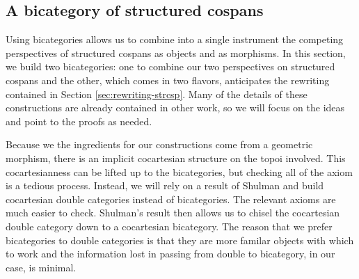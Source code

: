 \documentclass{amsart}
\theoremstyle{remark}
\theoremstyle{definition}
\begin{document}

\subsection{A bicategory of structured cospans}
\label{sec:bicat-strcsp}

Using bicategories allows us to combine into a single instrument the
competing perspectives of structured cospans as objects and as
morphisms. In this section, we build two bicategories: one to combine
our two perspectives on structured cospans and the other, which comes
in two flavors, anticipates the rewriting contained in Section
\ref{sec:rewriting-strcsp}. Many of the details of these
constructions are already contained in other work, so we will focus
on the ideas and point to the proofs as needed.

Because we the ingredients for our constructions come from a geometric
morphism, there is an implicit cocartesian structure on the topoi
involved. This cocartesianness can be lifted up to the bicategories,
but checking all of the axiom is a tedious process. Instead, we will
rely on a result of Shulman
%
%
and build
cocartesian double categories instead of bicategories. The relevant
axioms are much easier to check. Shulman's result then allows us to
chisel the cocartesian double category down to a cocartesian
bicategory. The reason that we prefer bicategories to double
categories is that they are more familar objects with which to work
and the information lost in passing from double to bicategory, in our
case, is minimal.
\end{document}
